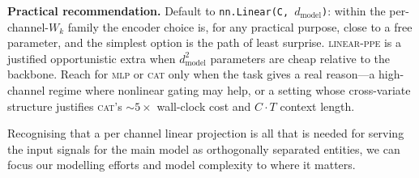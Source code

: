 \documentclass[11pt]{article}
\begin{document}
\textbf{Practical recommendation.} Default to
\texttt{nn.Linear(C, $d_{\text{model}}$)}: within the
per-channel-$W_k$ family the encoder choice is, for any practical
purpose, close to a free parameter, and the simplest option is the
path of least surprise. \textsc{linear-ppe} is a justified
opportunistic extra when $d_{\text{model}}^2$ parameters are cheap
relative to the backbone. Reach for \textsc{mlp} or \textsc{cat}
only when the task gives a real reason---a high-channel regime
where nonlinear gating may help, or a setting whose cross-variate
structure justifies \textsc{cat}'s ${\sim}5{\times}$ wall-clock
cost and $C{\cdot}T$ context length.

Recognising that a per channel linear projection is all that
is needed for serving the input signals for the main model as
orthogonally separated entities, we can focus
our modelling efforts and model complexity to where it matters.
\end{document}
